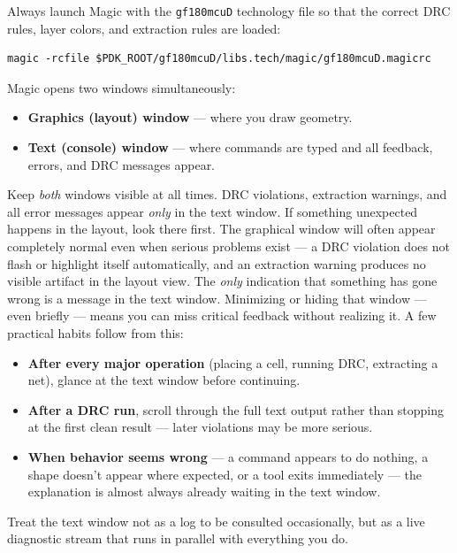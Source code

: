 \documentclass[11pt]{article}
\begin{document}
Always launch Magic with the \texttt{gf180mcuD} technology file so that
the correct DRC rules, layer colors, and extraction rules are loaded:

\begin{lstlisting}
magic -rcfile $PDK_ROOT/gf180mcuD/libs.tech/magic/gf180mcuD.magicrc
\end{lstlisting}

Magic opens two windows simultaneously:

\begin{itemize}[leftmargin=2em]
  \item \textbf{Graphics (layout) window} --- where you draw geometry.
  \item \textbf{Text (console) window} --- where commands are typed and
        all feedback, errors, and DRC messages appear.
\end{itemize}

\begin{warnbox}
Keep \emph{both} windows visible at all times.
DRC violations, extraction warnings, and all error messages appear
\emph{only} in the text window.
If something unexpected happens in the layout, look there first.
The graphical window will often appear completely normal even when serious problems exist --- a DRC violation does not flash or highlight itself automatically, and an extraction warning produces no visible artifact in the layout view. The \emph{only} indication that something has gone wrong is a message in the text window. Minimizing or hiding that window --- even briefly --- means you can miss critical feedback without realizing it.
A few practical habits follow from this:
\begin{itemize}
\item \textbf{After every major operation} (placing a cell, running DRC, extracting a net), glance at the text window before continuing.
\item \textbf{After a DRC run}, scroll through the full text output rather than stopping at the first clean result --- later violations may be more serious.
\item \textbf{When behavior seems wrong} --- a command appears to do nothing, a shape doesn't appear where expected, or a tool exits immediately --- the explanation is almost always already waiting in the text window.
\end{itemize}
Treat the text window not as a log to be consulted occasionally, but as a live diagnostic stream that runs in parallel with everything you do.
\end{warnbox}
\end{document}
